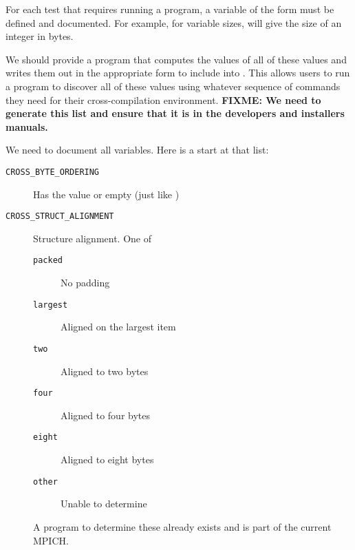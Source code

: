 \documentclass{article}
\def\fixme#1{\marginpar{FIXME:}\textbf{FIXME: #1}}
\begin{document}
For each test that requires running a program, a variable of the form
 must be defined and documented.  For example, for
variable sizes,  will give the size of an
integer in bytes.

We should provide a program that computes the values of all of these
values and writes them out in the appropriate form to include into
.  This allows users to run a program to discover all
of these values using whatever sequence of commands they need for
their cross-compilation environment.
\fixme{We need to generate this list and ensure that it is in the
  developers and installers manuals.}

We need to document all  variables.  Here is a start at that
list:
\begin{description}
\item[\texttt{CROSS_BYTE_ORDERING}]Has the value  or
  empty (just like )
\item[\texttt{CROSS_STRUCT_ALIGNMENT}]Structure alignment.  One of 
    \begin{description}
    \item[\texttt{packed}]No padding
    \item[\texttt{largest}]Aligned on the largest item
    \item[\texttt{two}]Aligned to two bytes
    \item[\texttt{four}]Aligned to four bytes
    \item[\texttt{eight}]Aligned to eight bytes
    \item[\texttt{other}]Unable to determine
    \end{description}
    A program to determine these already exists and is part of the
    current MPICH.


\end{description}
\end{document}
